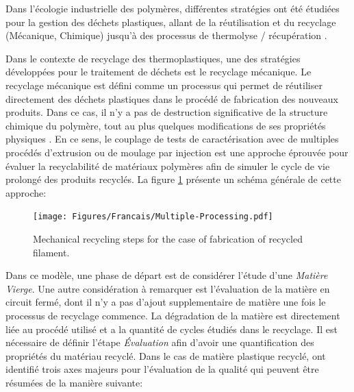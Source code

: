 Dans l'écologie industrielle des polymères, différentes stratégies ont été étudiées pour la gestion des déchets plastiques, allant de la réutilisation et du recyclage (Mécanique, Chimique) jusqu'à des processus de thermolyse / récupération \parencite{Clift1997, Hopewell2009, Al-Salem2009}.

Dans le contexte de recyclage des thermoplastiques, une des stratégies développées pour le traitement de déchets est le recyclage mécanique. 
Le recyclage mécanique est défini comme un processus qui permet de réutiliser directement des  déchets plastiques dans le procédé de fabrication des nouveaux produits. 
Dans ce cas, il n’y a pas de destruction significative de la structure chimique du polymère, tout au plus quelques modifications de ses propriétés physiques \parencite{Fisher2004, Hopewell2009, Al-Salem2009, Perugini2005, Robin2012}.
En ce sens, le couplage de tests de caractérisation avec de multiples procédés d'extrusion ou de moulage par injection est une approche éprouvée pour évaluer la recyclabilité de matériaux polymères afin de simuler le cycle de vie prolongé des produits recyclés.
La figure \ref{Fig:Mechanical.Recycling.Francais} présente un schéma générale de cette approche: 


\begin{figure}[H]
	\centering
	\texttt{[image: Figures/Francais/Multiple-Processing.pdf]}
	\caption[]{Mechanical recycling steps for the case of fabrication of recycled filament. }
	\label{Fig:Mechanical.Recycling.Francais}
\end{figure}	

Dans ce modèle, une phase de départ est de considérer l'étude d'une \textit{Matière Vierge}.
Une autre considération à remarquer est l'évaluation de la matière en circuit fermé, dont il n'y a pas d'ajout supplementaire de matière une fois le processus de recyclage commence.	
La dégradation de la matière est directement liée au procédé utilisé et a la quantité de cycles étudiés dans le recyclage.
Il est nécessaire de définir l'étape \textit{Évaluation} afin d'avoir une quantification des propriétés du matériau recyclé.
Dans le cas de matière plastique recyclé, \textcite{Karlsson2004,Vilaplana2008} ont identifié trois axes majeurs pour l'évaluation de la qualité qui peuvent être résumées de la manière suivante:


